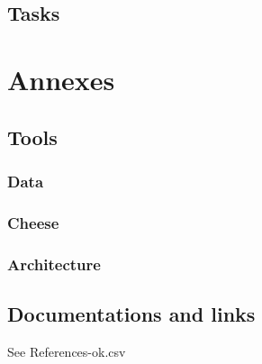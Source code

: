 \documentclass[8pt]{article} %
\begin{document}
\subsection{Tasks}

{\footnotesize

}

\section{Annexes}



\subsection{Tools}

{\footnotesize
\subsubsection{Data}

%
\subsubsection{Cheese}

\subsubsection{Architecture}
}

\subsection{Documentations and links}
See References-ok.csv
\end{document}
